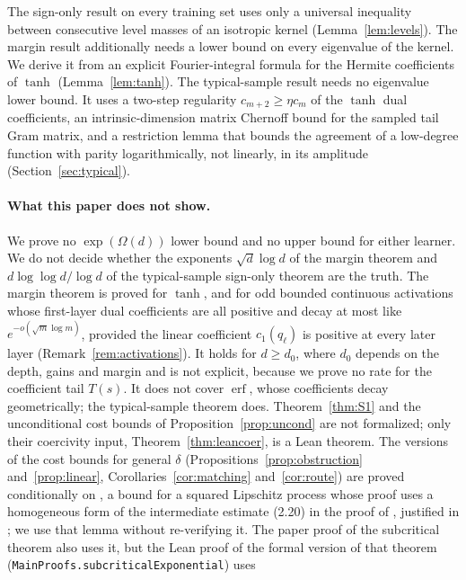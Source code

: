 \documentclass[11pt]{article}
\theoremstyle{definition}\newtheorem{assumption}[theorem]{Assumption}
\theoremstyle{remark}\newtheorem{remark}[theorem]{Remark}
\begin{document}
The sign-only result on every training set uses only a universal
inequality between consecutive level masses of an isotropic kernel
(Lemma~\ref{lem:levels}). The margin result additionally needs a lower
bound on every eigenvalue of the kernel. We derive it from an explicit
Fourier-integral formula for the Hermite coefficients of $\tanh$
(Lemma~\ref{lem:tanh}). The typical-sample result needs no eigenvalue
lower bound. It uses a two-step regularity $c_{m+2}\ge\eta c_m$ of the
$\tanh$ dual coefficients, an intrinsic-dimension matrix Chernoff bound for
the sampled tail Gram matrix, and a restriction lemma that bounds the
agreement of a low-degree function with parity logarithmically, not
linearly, in its amplitude (Section~\ref{sec:typical}).

\paragraph{What this paper does not show.} We prove no $\exp(\Omega(d))$
lower bound and no upper bound for either learner. We do not decide whether
the exponents $\sqrt d\log d$ of the margin theorem and
$d\log\log d/\log d$ of the typical-sample sign-only theorem are the truth.
The margin theorem is proved for
$\tanh$, and for odd bounded continuous activations whose first-layer dual
coefficients are all positive and decay at most like
$e^{-o(\sqrt m\log m)}$, provided the linear coefficient $c_1(q_\ell)$
is positive at every later layer (Remark~\ref{rem:activations}). It holds for
$d\ge d_0$, where $d_0$ depends on the depth, gains and margin and is not
explicit, because we prove no rate for the coefficient tail $T(s)$. It does not cover
$\operatorname{erf}$, whose coefficients decay geometrically; the
typical-sample theorem does. Theorem~\ref{thm:S1} and the unconditional
cost bounds of Proposition~\ref{prop:uncond} are not formalized; only
their coercivity input, Theorem~\ref{thm:leancoer}, is a Lean theorem. The
versions of the cost bounds for general $\delta$
(Propositions~\ref{prop:obstruction} and~\ref{prop:linear},
Corollaries~\ref{cor:matching} and~\ref{cor:route}) are proved
conditionally on \cite[Lemma~4.1]{subcritical}, a bound for a squared
Lipschitz process whose proof uses a homogeneous form of the intermediate
estimate (2.20) in the proof of \cite[Lemma~2.12]{lee}, justified in
\cite[Remark~4.2]{subcritical}; we use that lemma without re-verifying it.
The paper proof of the subcritical theorem \cite[Theorem~1.1]{subcritical}
also uses it, but the Lean proof of the formal version of that theorem
(\texttt{MainProofs.\allowbreak subcriticalExponential}) uses
\end{document}
